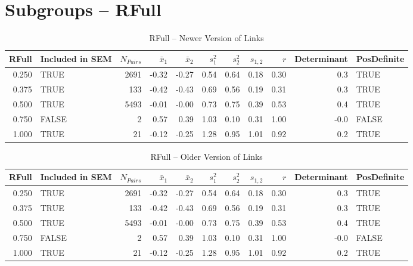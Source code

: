 \documentclass{article}\usepackage[]{graphicx}\usepackage[]{color}
\begin{document}
\section{Subgroups --  RFull }%
\begin{table}[ht]
\centering
\begin{tabular}{rlrrrrrrrrl}
  \hline
RFull & Included in SEM & $N_{Pairs}$ & $\bar{x}_1$ & $\bar{x}_2$ & $s_1^2$ & $s_2^2$ & $s_{1,2}$ & $r$ & Determinant & PosDefinite \\ 
  \hline
0.250 & TRUE & 2691 & -0.32 & -0.27 & 0.54 & 0.64 & 0.18 & 0.30 & 0.3 & TRUE \\ 
  0.375 & TRUE & 133 & -0.42 & -0.43 & 0.69 & 0.56 & 0.19 & 0.31 & 0.3 & TRUE \\ 
  0.500 & TRUE & 5493 & -0.01 & -0.00 & 0.73 & 0.75 & 0.39 & 0.53 & 0.4 & TRUE \\ 
  0.750 & FALSE & 2 & 0.57 & 0.39 & 1.03 & 0.10 & 0.31 & 1.00 & -0.0 & FALSE \\ 
  1.000 & TRUE & 21 & -0.12 & -0.25 & 1.28 & 0.95 & 1.01 & 0.92 & 0.2 & TRUE \\ 
   \hline
\end{tabular}
\caption{RFull -- Newer Version of Links} 
\end{table}
\begin{table}[ht]
\centering
\begin{tabular}{rlrrrrrrrrl}
  \hline
RFull & Included in SEM & $N_{Pairs}$ & $\bar{x}_1$ & $\bar{x}_2$ & $s_1^2$ & $s_2^2$ & $s_{1,2}$ & $r$ & Determinant & PosDefinite \\ 
  \hline
0.250 & TRUE & 2691 & -0.32 & -0.27 & 0.54 & 0.64 & 0.18 & 0.30 & 0.3 & TRUE \\ 
  0.375 & TRUE & 133 & -0.42 & -0.43 & 0.69 & 0.56 & 0.19 & 0.31 & 0.3 & TRUE \\ 
  0.500 & TRUE & 5493 & -0.01 & -0.00 & 0.73 & 0.75 & 0.39 & 0.53 & 0.4 & TRUE \\ 
  0.750 & FALSE & 2 & 0.57 & 0.39 & 1.03 & 0.10 & 0.31 & 1.00 & -0.0 & FALSE \\ 
  1.000 & TRUE & 21 & -0.12 & -0.25 & 1.28 & 0.95 & 1.01 & 0.92 & 0.2 & TRUE \\ 
   \hline
\end{tabular}
\caption{RFull -- Older Version of Links} 
\end{table}
\end{document}
